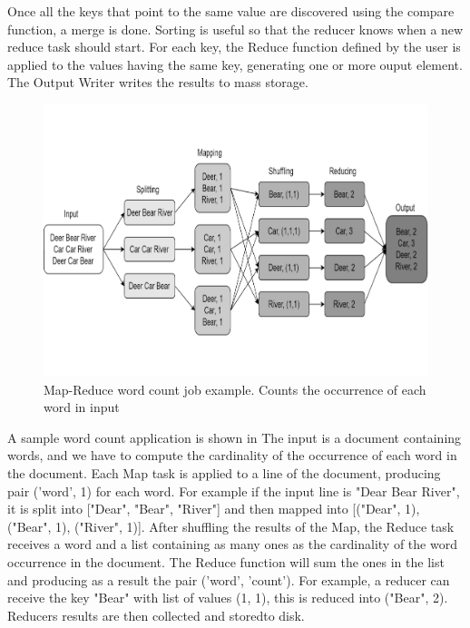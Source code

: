Once all the keys that point to the same value are discovered using the compare function, a merge is done. Sorting is useful so that the reducer knows when a new reduce task should start. For each key, the Reduce function defined by the user is applied to the values having the same key, generating one or more ouput element. The Output Writer writes the results to mass storage.
\begin{figure}
	\vspace{-1cm}
	\centering
	\includegraphics[width=\columnwidth]{Images/word_count_example.pdf}  
	\vspace{-1.5cm}
	\caption[map-reduce model]{Map-Reduce word count job example. Counts the occurrence of each word in input}
	\label{fig:wordCountExample}
\end{figure}

A sample word count application is shown in  The input is a document containing words, and we have to compute the cardinality of the occurrence of each word in the document. Each Map task is applied to a line of the document, producing pair (’word’, 1) for each word. For example if the input line is "Dear Bear River", it is split into ["Dear", "Bear", "River"] and then mapped into [("Dear", 1), ("Bear", 1), ("River", 1)]. After shuffling the results of the Map, the Reduce task receives a word and a list containing as many ones as the cardinality of the word occurrence in the document. The Reduce function will sum the ones in the list and producing as a result the pair (’word’, ’count’). For example, a reducer can receive the key "Bear" with list of values (1, 1), this is reduced into ("Bear", 2). Reducers results are then collected and storedto disk.

